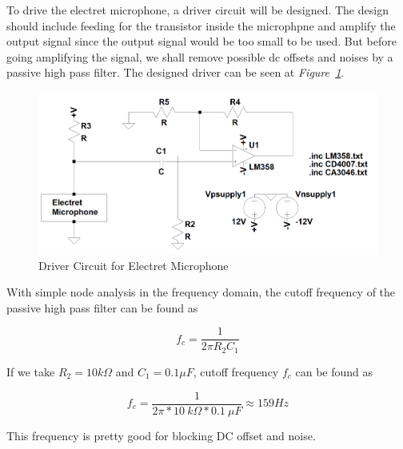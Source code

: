 \documentclass[paper]{IEEEtran}
\begin{document}
	To drive the electret microphone, a driver circuit will be designed. The design should include feeding for the transistor inside the microphpne and amplify the output signal since the output signal would be too small to be used. But before going amplifying the signal, we shall remove possible dc offsets and noises by a passive high pass filter. The designed driver can be seen at \textit{Figure~\ref{fig:micdr}}.

\begin{figure}[h!]
\setlength{\unitlength}{\textwidth}
\center 
\includegraphics[width=0.5\unitlength]{electret.png}
\caption{\label{fig:micdr} Driver Circuit for Electret Microphone }
\end{figure}	


With simple node analysis in the frequency domain, the cutoff frequency of the passive high pass filter can be found as

$$ f_{c} =\frac{1}{2\pi R_{2}C_{1}} $$

If we take $R_{2}=10k\Omega$ and $C_{1}=0.1\mu F$, cutoff frequency $f_c$ can be found as

$$ f_{c} =\frac{1}{2\pi*10~k\Omega*0.1~\mu F}\approx 159 Hz $$

This frequency is pretty good for blocking DC offset and noise.

\end{document}

